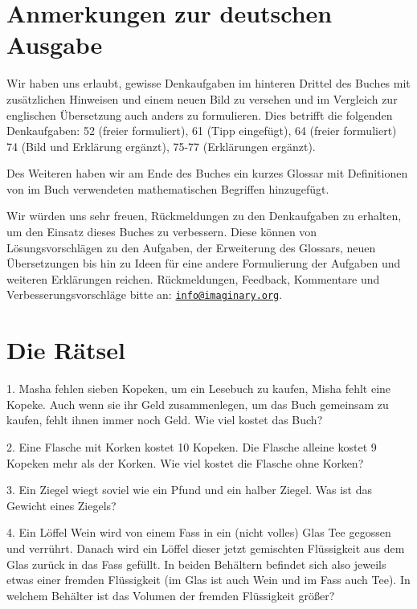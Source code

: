 \clearpage
\section*{Anmerkungen zur deutschen Ausgabe}
	Wir haben uns erlaubt, gewisse Denkaufgaben im hinteren Drittel des Buches mit zusätzlichen Hinweisen und einem neuen Bild zu versehen und im Vergleich zur englischen Übersetzung auch anders zu formulieren. Dies betrifft die folgenden Denkaufgaben:
	52 (freier formuliert), 61 (Tipp eingefügt), 64 (freier formuliert) 74 (Bild und Erklärung ergänzt), 75-77 (Erklärungen ergänzt).

	Des Weiteren haben wir am Ende des Buches ein kurzes Glossar mit Definitionen von im Buch verwendeten mathematischen Begriffen hinzugefügt.

	Wir würden uns sehr freuen, Rückmeldungen zu den Denkaufgaben zu erhalten, um den Einsatz dieses Buches zu verbessern. Diese können von Lösungsvorschlägen zu den Aufgaben, der Erweiterung des Glossars, neuen Übersetzungen bis hin zu Ideen für eine andere Formulierung der Aufgaben und weiteren Erklärungen reichen. Rückmeldungen, Feedback, Kommentare und Verbesserungsvorschläge bitte an:
	\href{mailto:info@imaginary.org}{\nolinkurl{info@imaginary.org}}.

\clearpage
\section*{Die Rätsel}

\begin{problem}{1.}
	Masha fehlen sieben Kopeken, um ein Lesebuch zu kaufen, Misha fehlt eine Kopeke. Auch wenn sie ihr Geld zusammenlegen, um das Buch gemeinsam zu kaufen, fehlt ihnen immer noch Geld. Wie viel kostet das Buch?
\end{problem}

\begin{problem}{2.}
	Eine Flasche mit Korken kostet 10 Kopeken. Die Flasche alleine kostet 9 Kopeken mehr als der Korken. Wie viel kostet die Flasche ohne Korken?
\end{problem}

\begin{problem}{3.}
	Ein Ziegel wiegt soviel wie ein Pfund und ein halber Ziegel. Was ist das Gewicht eines Ziegels?
\end{problem}

\begin{problem}{4.}
	Ein Löffel Wein wird von einem Fass in ein (nicht volles) Glas Tee gegossen und verrührt. Danach wird ein Löffel dieser jetzt gemischten Flüssigkeit aus dem Glas zurück in das Fass gefüllt. In beiden Behältern befindet sich also jeweils etwas einer fremden Flüssigkeit (im Glas ist auch Wein und im Fass auch Tee). In welchem Behälter ist das Volumen der fremden Flüssigkeit größer?
\end{problem}

